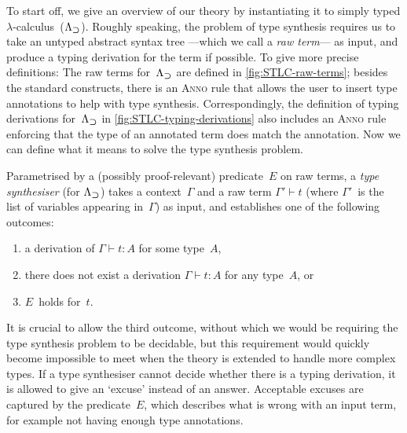 To start off, we give an overview of our theory by instantiating it to simply typed $\lambda$-calculus~($\Lambda_{\mathbin{\bm{\supset}}}$).
Roughly speaking, the problem of type synthesis requires us to take an untyped abstract syntax tree ---which we call a \emph{raw term}--- as input, and produce a typing derivation for the term if possible.
To give more precise definitions:
The raw terms for~$\Lambda_{\mathbin{\bm{\supset}}}$ are defined in \cref{fig:STLC-raw-terms}; besides the standard constructs, there is an \textsc{Anno} rule that allows the user to insert type annotations to help with type synthesis.
Correspondingly, the definition of typing derivations for~$\Lambda_{\mathbin{\bm{\supset}}}$ in \cref{fig:STLC-typing-derivations} also includes an \textsc{Anno} rule enforcing that the type of an annotated term does match the annotation.
Now we can define what it means to solve the type synthesis problem.

\begin{definition}
\label{def:STLC-type-synthesisers}
Parametrised by a (possibly proof-relevant) predicate~$E$ on raw terms, a \emph{type synthesiser} (for $\Lambda_{\mathbin{\bm{\supset}}}$) takes a context~$\Gamma$ and a raw term $\Gamma' \vdash t$ (where $\Gamma'$~is the list of variables appearing in~$\Gamma$) as input, and establishes one of the following outcomes:
\begin{enumerate}
\item a derivation of $\Gamma \vdash t : A$ for some type~$A$,
\item there does not exist a derivation $\Gamma \vdash t : A$ for any type~$A$, or
\item $E$~holds for~$t$.
\end{enumerate}
\end{definition}

It is crucial to allow the third outcome, without which we would be requiring the type synthesis problem to be decidable, but this requirement would quickly become impossible to meet when the theory is extended to handle more complex types.
If a type synthesiser cannot decide whether there is a typing derivation, it is allowed to give an `excuse' instead of an answer.
Acceptable excuses are captured by the predicate~$E$, which describes what is wrong with an input term, for example not having enough type annotations.

